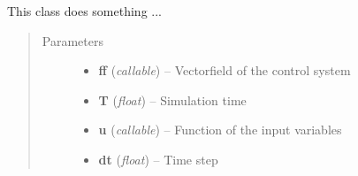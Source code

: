 \documentclass[letterpaper,10pt,english]{sphinxmanual}
\begin{document}
\begin{fulllineitems}
\label{pytrajectory:pytrajectory.simulation.Simulation}
This class does something ...
\begin{quote}\begin{description}
\item[{Parameters}] \leavevmode\begin{itemize}
\item {} 
\textbf{ff} (\emph{callable}) -- Vectorfield of the control system

\item {} 
\textbf{T} (\emph{float}) -- Simulation time

\item {} 
\textbf{u} (\emph{callable}) -- Function of the input variables

\item {} 
\textbf{dt} (\emph{float}) -- Time step

\end{itemize}

\end{description}\end{quote}

\begin{fulllineitems}
\label{pytrajectory:pytrajectory.simulation.Simulation.calcStep}
\end{fulllineitems}


\begin{fulllineitems}
\label{pytrajectory:pytrajectory.simulation.Simulation.rhs}
\end{fulllineitems}


\begin{fulllineitems}
\label{pytrajectory:pytrajectory.simulation.Simulation.simulate}
\end{fulllineitems}


\end{fulllineitems}
\end{document}
